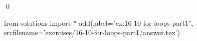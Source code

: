 
\begin{ex}
  \label{ex:16-10-for-loops-part1}
  
  \qed
\end{ex}
\begin{python0}
from solutions import *
add(label="ex:16-10-for-loops-part1",
    srcfilename='exercises/16-10-for-loops-part1/answer.tex')
\end{python0}
